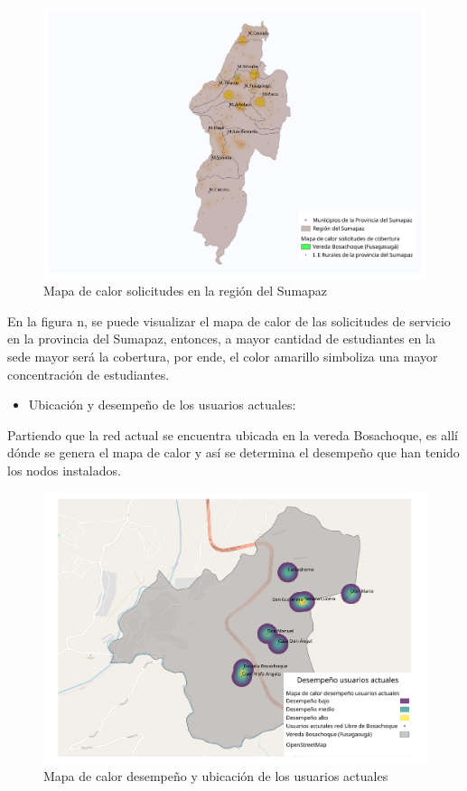 \documentclass[]{article}
\providecommand{\tightlist}{%
  \setlength{\itemsep}{0pt}\setlength{\parskip}{0pt}}
\begin{document}
\begin{figure}
\centering
\includegraphics{calor_s.pdf}
\caption{Mapa de calor solicitudes en la región del Sumapaz}
\end{figure}

En la figura n, se puede visualizar el mapa de calor de las solicitudes
de servicio en la provincia del Sumapaz, entonces, a mayor cantidad de
estudiantes en la sede mayor será la cobertura, por ende, el color
amarillo simboliza una mayor concentración de estudiantes.

\begin{itemize}
\tightlist
\item
  Ubicación y desempeño de los usuarios actuales:
\end{itemize}

Partiendo que la red actual se encuentra ubicada en la vereda
Bosachoque, es allí dónde se genera el mapa de calor y así se determina
el desempeño que han tenido los nodos instalados.

\begin{figure}
\centering
\includegraphics{Desempeno_usuarios_actuales_bosachoque.pdf}
\caption{Mapa de calor desempeño y ubicación de los usuarios actuales}
\end{figure}
\end{document}
